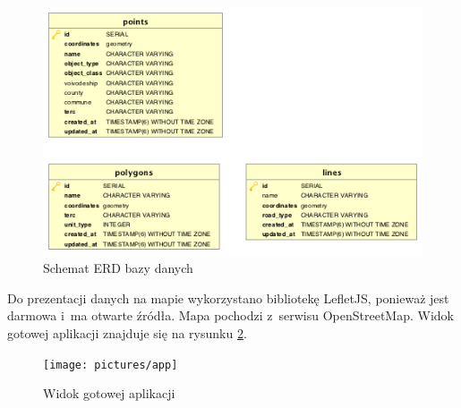 \documentclass[printmode]{mgr}
\begin{document}
\begin{figure}[H]
  \centering
  \includegraphics[width=1\linewidth]{pictures/erd}
  \caption{Schemat ERD bazy danych}
  \label{fig:erd}
\end{figure}

Do prezentacji danych na mapie wykorzystano bibliotekę LefletJS, ponieważ jest darmowa i~ma otwarte źródła. Mapa pochodzi z~serwisu OpenStreetMap. Widok gotowej aplikacji znajduje się na rysunku \ref{fig:app}.

\begin{figure}[H]
  \centering
  \texttt{[image: pictures/app]}
  \caption{Widok gotowej aplikacji}
  \label{fig:app}
\end{figure}
\end{document}
